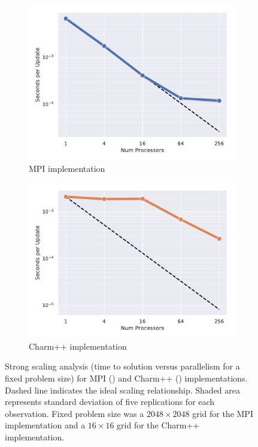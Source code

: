 
\begin{figure}
\begin{subfigure}[b]{0.5\textwidth}
\includegraphics[width=\textwidth]{img/MPIStrong}
\caption{
MPI implementation
}
\label{fig:mpi_weak}
\end{subfigure}
\begin{subfigure}[b]{0.5\textwidth}
  \includegraphics[width=\textwidth]{img/CharmStrong}
\caption{
Charm++ implementation
}
\label{fig:charm_weak}
\end{subfigure}
\caption{
Strong scaling analysis (time to solution versus parallelism for a fixed problem size) for MPI () and Charm++ () implementations.
Dashed line indicates the ideal scaling relationship.
Shaded area represents standard deviation of five replications for each observation.
Fixed problem size was a $2048\times2048$ grid for the MPI implementation and a $16\times16$ grid for the Charm++ implementation.
}
\label{fig:weak}
\end{figure}
